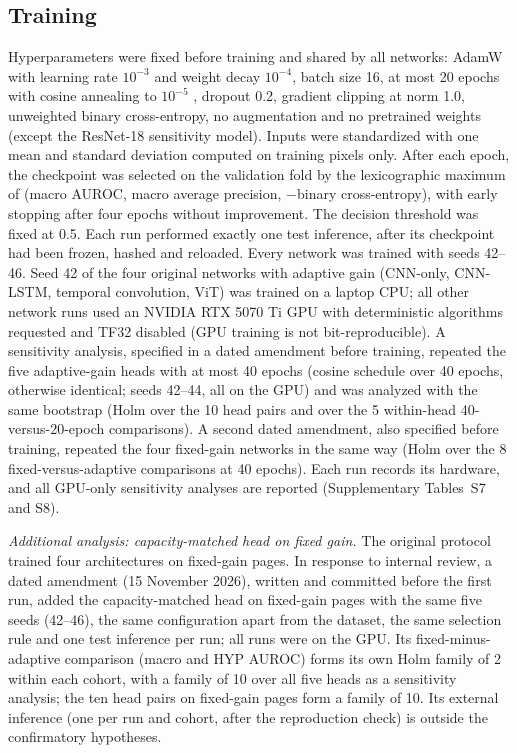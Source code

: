 \documentclass{wlscirep}
\begin{document}
\subsection*{Training}
Hyperparameters were fixed before training and shared by all networks: AdamW \cite{loshchilov2019adamw} with learning rate $10^{-3}$ and weight decay $10^{-4}$, batch size 16, at most 20 epochs with cosine annealing to $10^{-5}$ \cite{loshchilov2017sgdr}, dropout 0.2, gradient clipping at norm 1.0, unweighted binary cross-entropy, no augmentation and no pretrained weights (except the ResNet-18 sensitivity model). Inputs were standardized with one mean and standard deviation computed on training pixels only. After each epoch, the checkpoint was selected on the validation fold by the lexicographic maximum of (macro AUROC, macro average precision, $-$binary cross-entropy), with early stopping after four epochs without improvement. The decision threshold was fixed at 0.5. Each run performed exactly one test inference, after its checkpoint had been frozen, hashed and reloaded. Every network was trained with seeds 42--46. Seed 42 of the four original networks with adaptive gain (CNN-only, CNN-LSTM, temporal convolution, ViT) was trained on a laptop CPU; all other network runs used an NVIDIA RTX 5070 Ti GPU with deterministic algorithms requested and TF32 disabled (GPU training is not bit-reproducible). A sensitivity analysis, specified in a dated amendment before training, repeated the five adaptive-gain heads with at most 40 epochs (cosine schedule over 40 epochs, otherwise identical; seeds 42--44, all on the GPU) and was analyzed with the same bootstrap (Holm over the 10 head pairs and over the 5 within-head 40-versus-20-epoch comparisons). A second dated amendment, also specified before training, repeated the four fixed-gain networks in the same way (Holm over the 8 fixed-versus-adaptive comparisons at 40 epochs). Each run records its hardware, and all GPU-only sensitivity analyses are reported (Supplementary Tables~S7 and S8).

\emph{Additional analysis: capacity-matched head on fixed gain.} The original protocol trained four architectures on fixed-gain pages. In response to internal review, a dated amendment (15 November 2026), written and committed before the first run, added the capacity-matched head on fixed-gain pages with the same five seeds (42--46), the same configuration apart from the dataset, the same selection rule and one test inference per run; all runs were on the GPU. Its fixed-minus-adaptive comparison (macro and HYP AUROC) forms its own Holm family of 2 within each cohort, with a family of 10 over all five heads as a sensitivity analysis; the ten head pairs on fixed-gain pages form a family of 10. Its external inference (one per run and cohort, after the reproduction check) is outside the confirmatory hypotheses.
\end{document}
